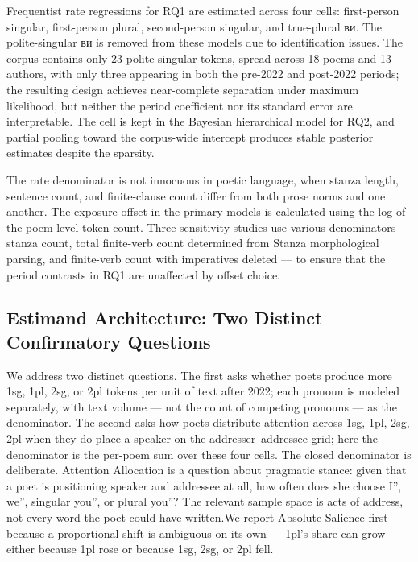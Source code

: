 \documentclass[12pt]{interact}
\theoremstyle{plain}%
\theoremstyle{definition}
\theoremstyle{remark}
\begin{document}
Frequentist rate regressions for RQ1 are estimated across four cells: first-person singular, first-person plural, second-person singular, and true-plural {\ukrainianfont ви}. The polite-singular {\ukrainianfont ви} is removed from these models due to identification issues. The corpus contains only 23 polite-singular tokens, spread across 18 poems and 13 authors, with only three appearing in both the pre-2022 and post-2022 periods; the resulting design achieves near-complete separation under maximum likelihood, but neither the period coefficient nor its standard error are interpretable. The cell is kept in the Bayesian hierarchical model for RQ2, and partial pooling toward the corpus-wide intercept produces stable posterior estimates despite the sparsity.

The rate denominator is not innocuous in poetic language, when stanza length, sentence count, and finite-clause count differ from both prose norms and one another. The exposure offset in the primary models is calculated using the log of the poem-level token count. Three sensitivity studies use various denominators — stanza count, total finite-verb count determined from Stanza morphological parsing, and finite-verb count with imperatives deleted — to ensure that the period contrasts in RQ1 are unaffected by offset choice.

\subsection{Estimand Architecture: Two Distinct Confirmatory Questions}

We address two distinct questions. The first asks whether poets produce more 1sg, 1pl, 2sg, or 2pl tokens per unit of text after 2022; each pronoun is modeled separately, with text volume — not the count of competing pronouns — as the denominator. The second asks how poets distribute attention across {1sg, 1pl, 2sg, 2pl} when they do place a speaker on the addresser–addressee grid; here the denominator is the per-poem sum over these four cells. The closed denominator is deliberate. Attention Allocation is a question about pragmatic stance: given that a poet is positioning speaker and addressee at all, how often does she choose I'', we'', singular you'', or plural you''? The relevant sample space is acts of address, not every word the poet could have written.We report Absolute Salience first because a proportional shift is ambiguous on its own — 1pl's share can grow either because 1pl rose or because 1sg, 2sg, or 2pl fell.
\end{document}

